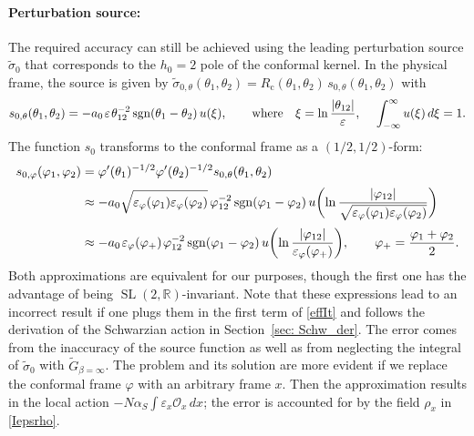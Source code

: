 \documentclass[12pt]{article}
\newcommand{\calO}{\mathcal{O}}
\newcommand{\RR}{\mathbb{R}}
\DeclareMathOperator{\sgn}{sgn}
\DeclareMathOperator{\SL}{SL}
\newcommand{\cc}{\mathrm{c}}
\newcommand{\tG}{\widetilde{G}}
\newcommand{\tsig}{\tilde{\sigma}}
\newcommand{\vep}{\varepsilon}
\newcommand{\vp}{\varphi}
\begin{document}
\paragraph{Perturbation source:}
The required accuracy can still be achieved using the leading perturbation source $\tsig_0$ that corresponds to the $h_0=2$ pole of the conformal kernel. In the physical frame, the source is given by $\tsig_{0,\theta}(\theta_1,\theta_2) =R_{\cc}(\theta_1,\theta_2)\,s_{0,\theta}(\theta_1,\theta_2)$ with
\begin{equation}
s_{0,\theta}(\theta_1,\theta_2)
= -a_{0}\kern1pt\vep\kern1pt\theta_{12}^{-2}
\sgn(\theta_1-\theta_2)\,u(\xi),\qquad
\text{where}\quad
\xi=\ln\frac{|\theta_{12}|}{\vep},\quad\:
\int_{-\infty}^{\infty}u(\xi)\,d\xi=1.
\end{equation}
The function $s_0$ transforms to the conformal frame as a $(1/2,1/2)$-form:
\begin{align}
s_{0,\vp}(\vp_1,\vp_2)
&=\vp'(\theta_1)^{-1/2}\vp'(\theta_2)^{-1/2}s_{0,\theta}(\theta_1,\theta_2)
\nonumber\\[2pt]
\label{s0_approx1}
&\approx -a_{0}\sqrt{\vep_{\vp}(\vp_{1})\vep_{\vp}(\vp_{2})}\,
\vp_{12}^{-2}\sgn(\vp_1-\vp_2)\, u\biggl(\ln\frac{|\vp_{12}|}
{\sqrt{\vep_{\vp}(\vp_{1})\vep_{\vp}(\vp_{2})}}\biggr)
\\[2pt]
\label{s0_approx2}
&\approx -a_{0}\kern1pt\vep_{\vp}(\vp_{+})\kern1pt\vp_{12}^{-2}
\sgn(\vp_1-\vp_2)\,u\biggl(\ln\frac{|\vp_{12}|}{\vep_{\vp}(\vp_{+})}\biggr),
\qquad \vp_{+}=\frac{\vp_1+\vp_2}{2}.
\end{align}
Both approximations are equivalent for our purposes, though the first one has the advantage of being $\SL(2,\RR)$-invariant. Note that these expressions lead to an incorrect result if one plugs them in the first term of \eqref{effIt} and follows the derivation of the Schwarzian action in Section~\ref{sec: Schw_der}. The error comes from the inaccuracy of the source function as well as from neglecting the integral of $\tsig_{0}$ with $\tG_{\beta=\infty}$. The problem and its solution are more evident if we replace the conformal frame $\vp$ with an arbitrary frame $x$. Then the approximation results in the local action $-N\alpha_S\int\vep_x\calO_x\,dx$; the error is accounted for by the field $\rho_x$ in \eqref{Iepsrho}.
\end{document}
